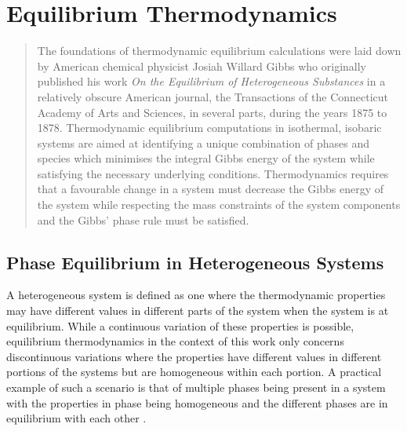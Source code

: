\chapter{Equilibrium Thermodynamics} \label{chap:equilibrium}

\begin{abstract}
    The foundations of thermodynamic equilibrium calculations were laid down by American chemical physicist Josiah Willard Gibbs who originally published his work \emph{On the Equilibrium of Heterogeneous Substances} in a relatively obscure American journal, the Transactions of the Connecticut Academy of Arts and Sciences, in several parts, during the years 1875 to 1878. Thermodynamic equilibrium computations in isothermal, isobaric systems are aimed at identifying a unique combination of phases and species which minimises the integral Gibbs energy of the system while satisfying the necessary underlying conditions. Thermodynamics requires that a favourable change in a system must decrease the Gibbs energy of the system while respecting the mass constraints of the system components and the Gibbs' phase rule must be satisfied.
\end{abstract}
	
\section{Phase Equilibrium in Heterogeneous Systems} \label{sec:multi_eqb}
    A heterogeneous system is defined as one where the thermodynamic properties may have different values in different parts of the system when the system is at equilibrium. While a continuous variation of these properties is possible, equilibrium thermodynamics in the context of this work only concerns discontinuous variations where the properties have different values in different portions of the systems but are homogeneous within each portion. A practical example of such a scenario is that of multiple phases being present in a system with the properties in phase being homogeneous and the different phases are in equilibrium with each other \cite{liu_wang_2016}.
	

